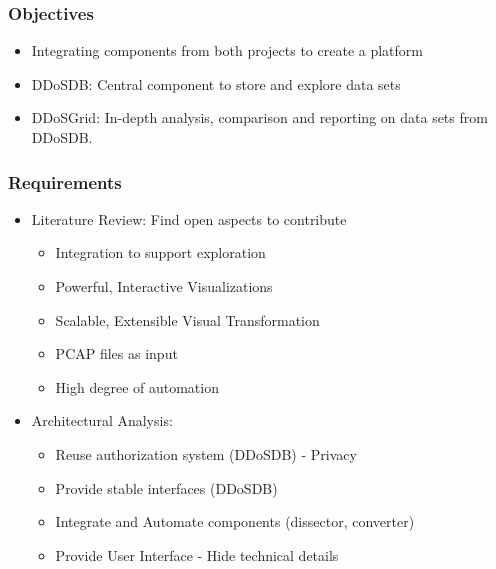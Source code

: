 \documentclass[fleqn]{beamer}
\begin{document}
    \begin{frame}
      \frametitle{Objectives}
      \begin{itemize}
          \item Integrating components from both projects to create a platform
          \item DDoSDB: Central component to store and explore data sets
          \item DDoSGrid: In-depth analysis, comparison and reporting on data sets from DDoSDB.
          
      \end{itemize}
    \end{frame}
    
    \begin{frame}
      \frametitle{Requirements}
      \begin{itemize}
          \item Literature Review: Find open aspects to contribute
          \begin{itemize}
              \item Integration to support exploration
              \item Powerful, Interactive Visualizations
              \item Scalable, Extensible Visual Transformation
              \item PCAP files as input
              \item High degree of automation
          \end{itemize}
          \item Architectural Analysis:
          \begin{itemize}
              \item Reuse authorization system (DDoSDB) - Privacy
              \item Provide stable interfaces (DDoSDB)
              \item Integrate and Automate components (dissector, converter)
              \item Provide User Interface - Hide technical details
          \end{itemize}
      \end{itemize}
    \end{frame}
    
\end{document}
